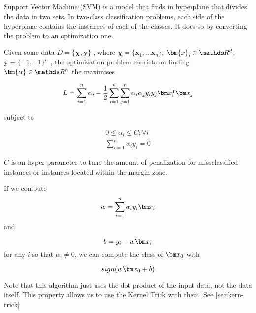   \begin{pre-delivery}
    Support Vector Machine\cite{Cortes1995} (SVM) is a model that finds in hyperplane that
    divides the data in two sets. In two-class classification problems, each
    side of the hyperplane contains the instances of each of the classes.
    It does so by converting the problem to an optimization one.

    Given some data
    $D = \{\bm{\chi}, \bm{y}\}$
    , where
    $\bm{\chi} = \{\bm{x}_1, \ldots \bm{x}_n\}$, $\bm{x}_i \in \reals^d$, $\bm{y} = \{-1, +1\}^n$
    , the optimization problem consists on finding $\bm{\alpha} \in \reals^n$
    the maximises

\begin{equation}
  L = \sum_{i = 1}^n\alpha_i -\frac{1}{2}\sum_{i = 1}^n\sum_{j = 1}^n\alpha_i\alpha_jy_iy_j\vx_i^\transp\vx_j
\end{equation}

subject to

\begin{align}
  0 \leq \alpha_i \leq C; \forall i\\
  \sum_{i = 1}^n \alpha_iy_i = 0
\end{align}


$C$ is an hyper-parameter to tune the amount of penalization for missclassified
instances or instances located within the margin zone.

If we compute
\begin{equation}
  w = \sum_{i = 1}^n\alpha_iy_i\vx_i
\end{equation}
and

\begin{equation}
  b = y_i - w\vx_i
\end{equation}
for any $i$ so that $\alpha_i \neq 0$, we can compute the class of $\vx_0$ with

\begin{equation}
sign(w\vx_0 + b)
\end{equation}

Note that this algorithm just uses the dot product of the input data, not the
data itself. This property allows us to use the Kernel Trick with them.
See \ref{sec:kern-trick}

\end{pre-delivery}


